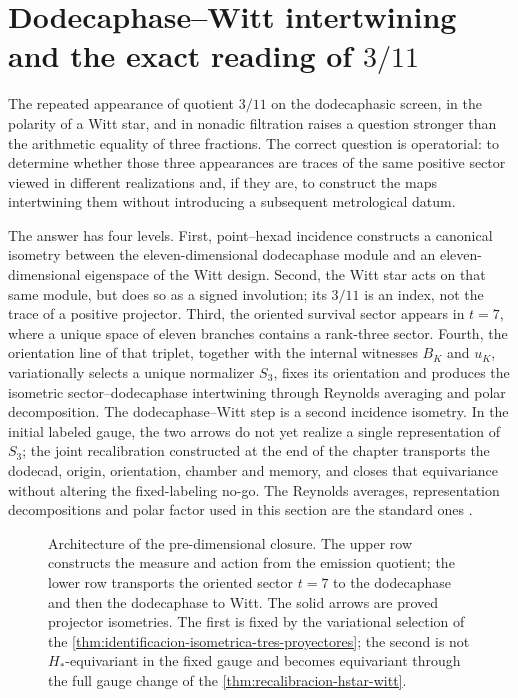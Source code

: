 \chapter{Dodecaphase--Witt intertwining and the exact reading of \texorpdfstring{\(3/11\)}{3/11}}
\label{chap:entrelazador-accion}

The repeated appearance of quotient \(3/11\) on the dodecaphasic screen,
in the polarity of a Witt star, and in nonadic filtration raises
a question stronger than the arithmetic equality of three fractions. The
correct question is operatorial: to determine whether those three appearances are
traces of the same positive sector viewed in different realizations and, if they
are, to construct the maps intertwining them without introducing a subsequent
metrological datum.

The answer has four levels. First, point--hexad incidence
constructs a canonical isometry between the eleven-dimensional dodecaphase
module and an eleven-dimensional eigenspace of the Witt design. Second, the
Witt star acts on that same module, but does so as a signed
involution; its \(3/11\) is an index, not the trace of a positive projector.
Third, the oriented survival sector appears in \(t=7\), where a
unique space of eleven branches contains a rank-three sector. Fourth, the
orientation line of that triplet, together with the internal witnesses
\(B_K\) and \(u_K\), variationally selects a unique normalizer
\(S_3\), fixes its orientation and produces the isometric sector--dodecaphase
intertwining through Reynolds averaging and
polar decomposition. The dodecaphase--Witt
step is a second incidence isometry. In the initial labeled gauge,
the two arrows do not yet realize a single representation
of \(S_3\); the joint recalibration constructed at the end of the chapter transports
the dodecad, origin, orientation, chamber and memory, and closes that
equivariance without altering the fixed-labeling no-go.
The Reynolds averages, representation decompositions and
polar factor used in this section are the standard ones
\cite{Serre1977Representations,HornJohnson2013}.

\begin{figure}[htbp]
\centering

\caption{Architecture of the pre-dimensional closure. The upper row constructs
the measure and action from the emission quotient; the lower row transports
the oriented sector \(t=7\) to the dodecaphase and then the dodecaphase to
Witt. The solid arrows are proved projector isometries. The
first is fixed by the variational selection of the
\cref{thm:identificacion-isometrica-tres-proyectores}; the second is not
\(H_*\)-equivariant in the fixed gauge and becomes equivariant through the
full gauge change of the \cref{thm:recalibracion-hstar-witt}.}
\label{fig:entrelazador-accion}
\end{figure}

